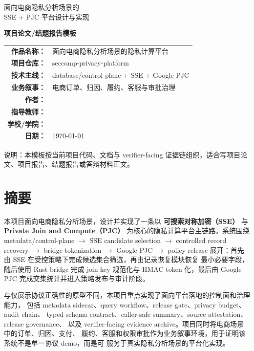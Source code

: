 \documentclass[UTF8,a4paper,12pt,oneside]{ctexrep}
\newcommand{\project}{seccomp-privacy-platform}
\newcommand{\pipeline}{metadata/control-plane $\rightarrow$ SSE candidate selection $\rightarrow$ controlled record recovery $\rightarrow$ bridge tokenization $\rightarrow$ Google PJC $\rightarrow$ policy release}
\begin{document}
\begin{titlepage}
  \centering
  \vspace*{1.5cm}
  {\heiti 面向电商隐私分析场景的\\[0.3em]SSE + PJC 平台设计与实现\par}
  \vspace{1.2cm}
  {\bfseries 项目论文/结题报告模板\par}
  \vspace{2.2cm}
  \begin{tabular}{>{\bfseries}r l}
    作品名称： & 面向电商隐私分析场景的隐私计算平台 \\
    项目仓库： & \project \\
    技术主线： & database/control-plane + SSE + Google PJC \\
    业务叙事： & 电商订单、归因、履约、客服与审批治理 \\
    作者： & \underline{\hspace{6cm}} \\
    指导教师： & \underline{\hspace{6cm}} \\
    学校/学院： & \underline{\hspace{6cm}} \\
    日期： & \today \\
  \end{tabular}
  \vfill
  {说明：本模板按当前项目代码、文档与 verifier-facing 证据链组织，适合写项目论文、项目报告、结题报告或答辩材料正文。\par}
\end{titlepage}


\chapter*{摘要}

本项目面向电商隐私分析场景，设计并实现了一条以 \textbf{可搜索对称加密（SSE）}
与 \textbf{Private Join and Compute（PJC）} 为核心的隐私计算平台主链路。系统围绕
\pipeline{} 展开：首先由 SSE 在受控策略下完成候选集合筛选，再由记录恢复模块恢复
最小必要字段，随后使用 Rust bridge 完成 join key 规范化与 HMAC token 化，最后由
Google PJC 完成交集统计并进入策略发布与审计阶段。

与仅展示协议正确性的原型不同，本项目重点实现了面向平台落地的控制面和治理能力，
包括 metadata sidecar、query workflow、release gate、privacy budget、audit chain、
typed schema contract、caller-safe summary、source attestation、release governance、
以及 verifier-facing evidence archive。项目同时将电商场景中的订单、归因、支付、
履约、客服和权限审批作为业务叙事环境，用于证明该系统不是单一协议 demo，而是可
服务于真实隐私分析场景的平台化实现。
\end{document}

